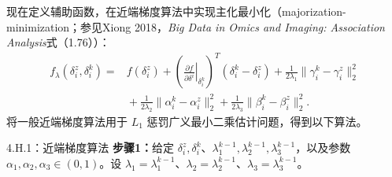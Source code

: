 现在定义辅助函数，在近端梯度算法中实现主化最小化（majorization-minimization；参见Xiong 2018，\textit{Big Data in Omics and Imaging: Association Analysis}式（1.76））：
\begin{equation}
\begin{aligned}
f_\lambda(\delta_i^z,\delta_i^k)={}&f(\delta_i^z)
+\left(\left.\frac{\partial f}{\partial\delta^i}\right|_{\delta_i^k}\right)^T
(\delta_i^k-\delta_i^z)
+\frac1{2\lambda_1}\|\gamma_i^k-\gamma_i^z\|_2^2\\
&{}+\frac1{2\lambda_2}\|\alpha_i^k-\alpha_i^z\|_2^2
+\frac1{2\lambda_3}\|\beta_i^k-\beta_i^z\|_2^2.
\end{aligned}\tag{4.H.9}
\end{equation}
将一般近端梯度算法用于 $L_1$ 惩罚广义最小二乘估计问题，得到以下算法。

\begin{bookalgorithm}{4.H.1：近端梯度算法}
\textbf{步骤1：}给定 $\delta_i^z,\delta_i^k$、$\lambda_1^{k-1},\lambda_2^{k-1},\lambda_3^{k-1}$，以及参数 $\alpha_1,\alpha_2,\alpha_3\in(0,1)$。设
$\lambda_1=\lambda_1^{k-1}$、$\lambda_2=\lambda_2^{k-1}$、$\lambda_3=\lambda_3^{k-1}$。


\end{bookalgorithm}
